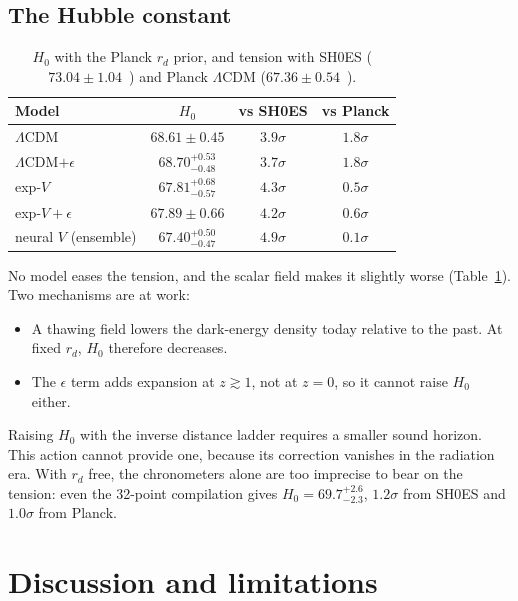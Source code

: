 \documentclass[11pt,a4paper]{article}
\begin{document}
\subsection{The Hubble constant}
\begin{table}[h]\centering\small
\caption{$H_0$ with the Planck $r_d$ prior, and tension with SH0ES ($73.04\pm1.04$~\cite{2112.04510}) and Planck $\Lambda$CDM ($67.36\pm0.54$~\cite{1807.06209}).}\label{tab:h0}
\begin{tabular}{lccc}\toprule
Model & $H_0$ & vs SH0ES & vs Planck\\\midrule
$\Lambda$CDM & $68.61\pm0.45$ & $3.9\sigma$ & $1.8\sigma$\\
$\Lambda$CDM$+\epsilon$ & $68.70^{+0.53}_{-0.48}$ & $3.7\sigma$ & $1.8\sigma$\\
exp-$V$ & $67.81^{+0.68}_{-0.57}$ & $4.3\sigma$ & $0.5\sigma$\\
exp-$V+\epsilon$ & $67.89\pm0.66$ & $4.2\sigma$ & $0.6\sigma$\\
neural $V$ (ensemble) & $67.40^{+0.50}_{-0.47}$ & $4.9\sigma$ & $0.1\sigma$\\\bottomrule
\end{tabular}
\end{table}

No model eases the tension, and the scalar field makes it slightly worse (Table~\ref{tab:h0}). Two mechanisms are at work:
\begin{itemize}
\item A thawing field lowers the dark-energy density today relative to the past. At fixed $r_d$, $H_0$ therefore decreases.
\item The $\epsilon$ term adds expansion at $z\gtrsim1$, not at $z=0$, so it cannot raise $H_0$ either.
\end{itemize}
Raising $H_0$ with the inverse distance ladder requires a smaller sound horizon. This action cannot provide one, because its correction vanishes in the radiation era. With $r_d$ free, the chronometers alone are too imprecise to bear on the tension: even the 32-point compilation gives $H_0=69.7^{+2.6}_{-2.3}$, $1.2\sigma$ from SH0ES and $1.0\sigma$ from Planck.

\section{Discussion and limitations}\label{sec:discussion}
\end{document}
